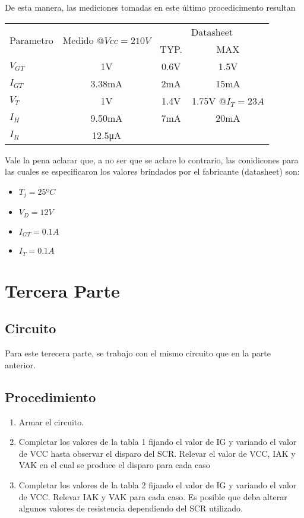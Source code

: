 De esta manera, las mediciones tomadas en este último procedicimento resultan
\begin{table}[H]
  \begin{center}
    \begin{tabular}{l|c|c|c}
      \multirow{2}{*}{Parametro} &\multirow{2}{*}{Medido @$Vcc=210V$}  &\multicolumn{2}{c}{Datasheet}  \\
      \cline{3-4}
                &  &TYP. &MAX  \\
      \hline
      $V_{GT}$  &1V      &0.6V   &1.5V  \\
      $I_{GT}$  &3.38mA  &2mA   &15mA  \\
      $V_{T}$   &1V      &1.4V   &1.75V @$I_T=23A$  \\
      $I_{H}$   &9.50mA  &7mA   &20mA  \\
      $I_{R}$   &12.5\unit{\micro\ampere} & &
    \end{tabular}
  \end{center} 
\end{table}
Vale la pena aclarar que, a no ser que se aclare lo contrario, las conidicones para las cuales se especificaron los 
valores brindados por el fabricante (datasheet) son:
\begin{itemize}
  \item $T_j=25ºC$ 
  \item $V_D=12V$ 
  \item $I_{GT}=0.1A$ 
  \item $I_{T}=0.1A$ 
\end{itemize}

\section{Tercera Parte}
\subsection{Circuito}
Para este terecera parte, se trabajo con el mismo circuito que en la parte anterior.
\subsection{Procedimiento}
\begin{enumerate}
  \item Armar el circuito.
  \item Completar los valores de la tabla 1 fijando el valor de IG y variando el valor
    de VCC hasta observar el disparo del SCR. Relevar el valor de VCC, IAK y VAK
    en el cual se produce el disparo para cada caso 
  \item Completar los valores de la tabla 2 fijando el valor de IG y variando el valor
    de VCC. Relevar IAK y VAK para cada caso. Es posible que deba alterar
    algunos valores de resistencia dependiendo del SCR utilizado.
\end{enumerate}
